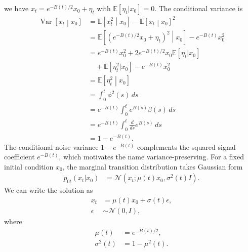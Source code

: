 \documentclass[reprint,amsmath,amssymb,aps,pra,10pt]{revtex4-2}
\begin{document}
we have $x_t=e^{-B(t)/2}x_0+\eta_t$ with $\mathbb{E}[\eta_t|x_0]=0$.
The conditional variance is
\begin{align}
    \operatorname{Var}
    \left[
        x_t
        \middle|x_0
    \right]
    &=
    \mathbb{E}
    \left[
        x_t^2
        \middle|x_0
    \right]
    -
    \mathbb{E}
    \left[
        x_t
        \middle|x_0
    \right]^2
    \nonumber \\
    &=
    \mathbb{E}
    \left[
        \left(
            e^{-B(t)/2}x_0+\eta_t
        \right)^2
        \middle|x_0
    \right]
    -
    e^{-B(t)}x_0^2
    \nonumber \\
    &=
    e^{-B(t)}x_0^2
    +
    2e^{-B(t)/2}x_0
    \mathbb{E}[\eta_t|x_0]
    \nonumber \\
    &\quad
    +
    \mathbb{E}[\eta_t^2|x_0]
    -
    e^{-B(t)}x_0^2
    \nonumber \\
    &=
    \mathbb{E}
    \left[
        \eta_t^2
        \middle|x_0
    \right]
    \nonumber \\
    &=
    \int_0^t
    \phi^2(s)\,ds
    \nonumber \\
    &=
    e^{-B(t)}
    \int_0^t
    e^{B(s)}
    \beta(s)\,ds
    \nonumber \\
    &=
    e^{-B(t)}
    \int_0^t
    \frac{d}{ds}
    e^{B(s)}
    \,ds
    \nonumber \\
    &=
    1-e^{-B(t)}.
\end{align}
The conditional noise variance $1-e^{-B(t)}$ complements the squared signal coefficient $e^{-B(t)}$, which motivates the name variance-preserving.
For a fixed initial condition $x_0$, the marginal transition distribution takes Gaussian form
\begin{equation}
    \begin{aligned}
        p_{0t}(x_t|x_0)
        &=
        \mathcal{N}
        \left(
            x_t;
            \mu(t)x_0,
            \sigma^2(t)I
        \right).
    \end{aligned}
\end{equation}
We can write the solution as
\begin{equation}
    \begin{aligned}
        x_t
        &=
        \mu(t)x_0
        +
        \sigma(t)\epsilon,
        \\
        \epsilon
        &\sim
        \mathcal{N}(0,I),
    \end{aligned}
\end{equation}
where
\begin{equation}
    \begin{aligned}
        \mu(t)
        &=
        e^{-B(t)/2},
        \\
        \sigma^2(t)
        &=
        1-\mu^2(t).
    \end{aligned}
\end{equation}
\end{document}
